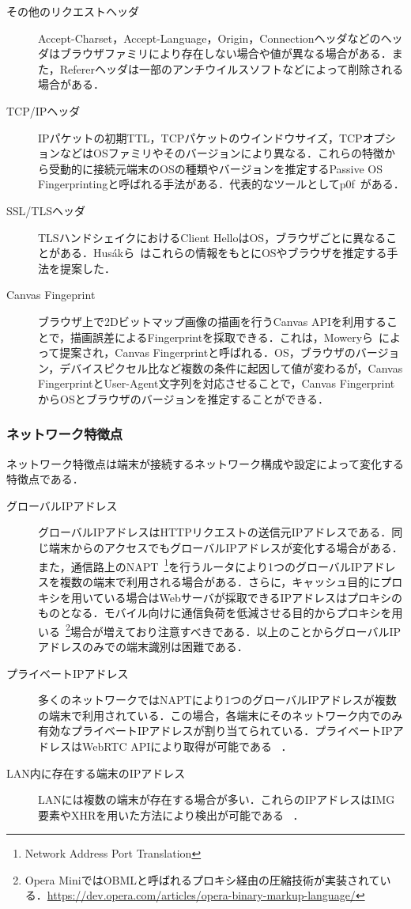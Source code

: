 \begin{description}
\item[その他のリクエストヘッダ]Accept-Charset，Accept-Language，Origin，Connectionヘッダなどのヘッダはブラウザファミリにより存在しない場合や値が異なる場合がある．また，Refererヘッダは一部のアンチウイルスソフトなどによって削除される場合がある．
\item[TCP/IPヘッダ]IPパケットの初期TTL，TCPパケットのウインドウサイズ，TCPオプションなどはOSファミリやそのバージョンにより異なる．これらの特徴から受動的に接続元端末のOSの種類やバージョンを推定するPassive OS Fingerprintingと呼ばれる手法がある．代表的なツールとしてp0f~\cite{p0f}がある．
\item[SSL/TLSヘッダ]TLSハンドシェイクにおけるClient HelloはOS，ブラウザごとに異なることがある．Hus{\'a}kら~\cite{husak2016https}はこれらの情報をもとにOSやブラウザを推定する手法を提案した．
\item[Canvas Fingeprint]ブラウザ上で2Dビットマップ画像の描画を行うCanvas APIを利用することで，描画誤差によるFingerprintを採取できる．これは，Moweryら~\cite{mowery2012pixel}によって提案され，Canvas Fingerprintと呼ばれる．OS，ブラウザのバージョン，デバイスピクセル比など複数の条件に起因して値が変わるが，Canvas FingerprintとUser-Agent文字列を対応させることで，Canvas FingerprintからOSとブラウザのバージョンを推定することができる．
\end{description}
\subsubsection{ネットワーク特徴点}
ネットワーク特徴点は端末が接続するネットワーク構成や設定によって変化する特徴点である．
\begin{description}
\item[グローバルIPアドレス]グローバルIPアドレスはHTTPリクエストの送信元IPアドレスである．同じ端末からのアクセスでもグローバルIPアドレスが変化する場合がある．また，通信路上のNAPT~\footnote{Network Address Port Translation}を行うルータにより1つのグローバルIPアドレスを複数の端末で利用される場合がある．さらに，キャッシュ目的にプロキシを用いている場合はWebサーバが採取できるIPアドレスはプロキシのものとなる．モバイル向けに通信負荷を低減させる目的からプロキシを用いる~\footnote{Opera MiniではOBMLと呼ばれるプロキシ経由の圧縮技術が実装されている．\url{https://dev.opera.com/articles/opera-binary-markup-language/}}場合が増えており注意すべきである．以上のことからグローバルIPアドレスのみでの端末識別は困難である．
\item[プライベートIPアドレス]多くのネットワークではNAPTにより1つのグローバルIPアドレスが複数の端末で利用されている．この場合，各端末にそのネットワーク内でのみ有効なプライベートIPアドレスが割り当てられている．プライベートIPアドレスはWebRTC APIにより取得が可能である~\cite{細井理央2015ブラウザが属するネットワークの情報を採取する} ．
\item[LAN内に存在する端末のIPアドレス]LANには複数の端末が存在する場合が多い．これらのIPアドレスはIMG要素やXHRを用いた方法により検出が可能である~\cite{細井理央2015ブラウザが属するネットワークの情報を採取する} ．
\end{description}
